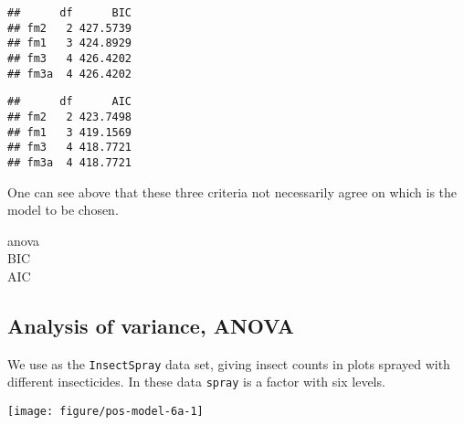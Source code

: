 \documentclass[paper=a4,headsepline,BCOR=12mm,twoside,open=right,%
titlepage,headings=small,fontsize=10pt,index=totoc,bibliography=totoc,%
captions=tableheading,captions=nooneline]{scrbook}\usepackage{knitr}
\begin{document}
\begin{knitrout}\footnotesize
{}\color{fgcolor}\begin{kframe}
\begin{alltt}
\end{alltt}
\begin{verbatim}
##      df      BIC
## fm2   2 427.5739
## fm1   3 424.8929
## fm3   4 426.4202
## fm3a  4 426.4202
\end{verbatim}
\begin{alltt}
\end{alltt}
\begin{verbatim}
##      df      AIC
## fm2   2 423.7498
## fm1   3 419.1569
## fm3   4 418.7721
## fm3a  4 418.7721
\end{verbatim}
\end{kframe}
\end{knitrout}

One can see above that these three criteria not necessarily agree on which is the model to be chosen.

\begin{description}
\item[anova] 
\item[BIC] 
\item[AIC] 
\end{description}

\subsection{Analysis of variance, ANOVA}\label{sec:anova}

We use as the \texttt{InsectSpray} data set, giving insect counts in plots sprayed with different insecticides. In these data \texttt{spray} is a factor with six levels.

\begin{knitrout}\footnotesize
{}\color{fgcolor}\begin{kframe}
\begin{alltt}
 \hlkwb{<-}  \hlopt{~}   
\end{alltt}
\end{kframe}
\end{knitrout}

\begin{knitrout}\footnotesize
{}\color{fgcolor}\begin{kframe}
\begin{alltt}
  \hlstd{=} \hlstd{)}
\end{alltt}
\end{kframe}

{\centering \texttt{[image: figure/pos-model-6a-1]} 

}



\end{knitrout}
\end{document}
